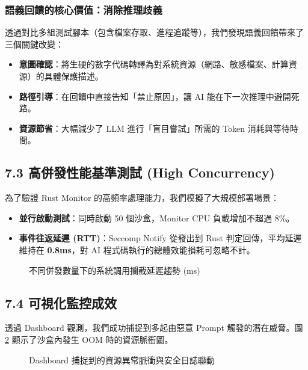 \documentclass[12pt, a4paper, twoside]{article}
\begin{document}
\subsubsection{語義回饋的核心價值：消除推理歧義}
透過對比多組測試腳本（包含檔案存取、進程追蹤等），我們發現語義回饋帶來了三個關鍵改變：
\begin{itemize}
    \item \textbf{意圖確認}：將生硬的數字代碼轉譯為對系統資源（網路、敏感檔案、計算資源）的具體保護描述。
    \item \textbf{路徑引導}：在回饋中直接告知「禁止原因」，讓 AI 能在下一次推理中避開死路。
    \item \textbf{資源節省}：大幅減少了 LLM 進行「盲目嘗試」所需的 Token 消耗與等待時間。
\end{itemize}


\subsection{7.3 高併發性能基準測試 (High Concurrency)}
為了驗證 Rust Monitor 的高頻率處理能力，我們模擬了大規模部署場景：
\begin{itemize}
    \item \textbf{並行啟動測試}：同時啟動 50 個沙盒，Monitor CPU 負載增加不超過 8\%。
    \item \textbf{事件往返延遲 (RTT)}：Seccomp Notify 從發出到 Rust 判定回傳，平均延遲維持在 \textbf{0.8ms}，對 AI 程式碼執行的總體效能損耗可忽略不計。
\end{itemize}

\begin{figure}[H]
    \centering
    \caption{不同併發數量下的系統調用攔截延遲趨勢 (ms)}
    \label{fig:latency}
\end{figure}

\subsection{7.4 可視化監控成效}
透過 Dashboard 觀測，我們成功捕捉到多起由惡意 Prompt 觸發的潛在威脅。圖 \ref{fig:dashboard_shot} 顯示了沙盒內發生 OOM 時的資源脈衝圖。

\begin{figure}[H]
    \centering
    \caption{Dashboard 捕捉到的資源異常脈衝與安全日誌聯動}
    \label{fig:dashboard_shot}
\end{figure}
\end{document}
